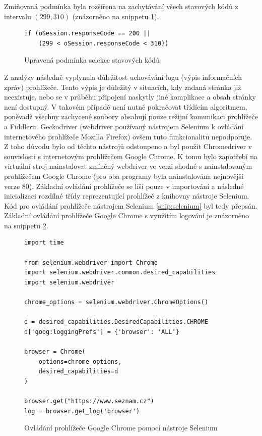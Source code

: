 \documentclass[thesis=M,czech,hidelinks]{FITthesis}[2013/05/06]
\begin{document}
Zmiňovaná podmínka byla rozšířena na zachytávání všech stavových kódů z intervalu $(299,310)$ (znázorněno na snippetu \ref{snip:fiddler_new_new}).
\begin{figure}[h]               
	\begin{verbatim}
if (oSession.responseCode == 200 || 
    (299 < oSession.responseCode < 310))
	\end{verbatim}      
	\caption{Upravená podmínka selekce stavových kódů}
	\label{snip:fiddler_new_new}
\end{figure}

Z analýzy následně vyplynula důležitost uchovávání logu (výpis informačních zpráv) prohlížeče. Tento výpis je důležitý v situacích, kdy zadaná stránka již neexistuje, nebo se v průběhu připojení naskytly jiné komplikace a obsah stránky není dostupný. V takovém případě není nutné pokračovat třídícím algoritmem, poněvadž všechny zachycené soubory obsahují pouze režijní komunikaci prohlížeče a Fiddleru. Geckodriver (webdriver používaný nástrojem Selenium k ovládání internetového prohlížeče Mozilla Firefox) ovšem tuto funkcionalitu nepodporuje. Z toho důvodu bylo od těchto nástrojů odstoupeno a byl použit Chromedriver v souvislosti s internetovým prohlížečem Google Chrome. K tomu bylo zapotřebí na virtuální stroj nainstalovat zmíněný webdriver ve verzi shodné s nainstalovaným prohlížečem Google Chrome (pro oba programy byla nainstalována nejnovější verze 80). Základní ovládání prohlížeče se liší pouze v importování a následné inicializaci rozdílné třídy reprezentující prohlížeč z knihovny nástroje Selenium. Kód pro ovládání prohlížeče nástrojem Selenium \ref{snip:selenium} byl tedy přepsán. Základní ovládání prohlížeče Google Chrome s využitím logování je znázorněno na snippetu \ref{snip:selenium_new}.

\begin{figure}[h]               
	\begin{verbatim}
import time 

from selenium.webdriver import Chrome
import selenium.webdriver.common.desired_capabilities
import selenium.webdriver

chrome_options = selenium.webdriver.ChromeOptions()

d = desired_capabilities.DesiredCapabilities.CHROME
d['goog:loggingPrefs'] = {'browser': 'ALL'}

browser = Chrome(
    options=chrome_options, 
    desired_capabilities=d
)

browser.get("https://www.seznam.cz")
log = browser.get_log('browser')
	\end{verbatim}      
	\caption{Ovládání prohlížeče Google Chrome pomocí nástroje Selenium}
	\label{snip:selenium_new}
\end{figure}
\end{document}
